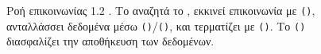 \begin{figure}[htbp]
\begin{chapterfigurebox}
\begin{tikzpicture}
\end{tikzpicture}
\end{chapterfigurebox}
\caption{Ροή επικοινωνίας  1.2 . Το  αναζητά το , εκκινεί επικοινωνία με \texttt{()}, ανταλλάσσει δεδομένα μέσω \texttt{()}/\texttt{()}, και τερματίζει με \texttt{()}. Το \texttt{()} διασφαλίζει την αποθήκευση των δεδομένων.}
\label{fig:scorm12_runtime_flow}
\end{figure}
